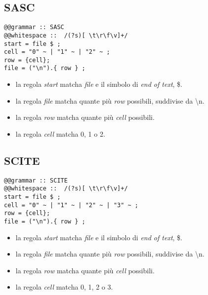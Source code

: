 \subsection{SASC}
{\selectfont
\begin{verbatim}
@@grammar :: SASC
@@whitespace ::  /(?s)[ \t\r\f\v]+/
start = file $ ;
cell = "0" ~ | "1" ~ | "2" ~ ;
row = {cell};
file = ("\n").{ row } ;
\end{verbatim}
}
\begin{itemize}
\item la regola \textit{start} matcha \textit{file} e il simbolo di \textit{end of text}, \$.
\item la regola \textit{file} matcha quante più \textit{row} possibili, suddivise da \textbackslash n.
\item la regola \textit{row} matcha quante più \textit{cell} possibili.
\item la regola \textit{cell} matcha 0, 1 o 2.
\end{itemize}

\subsection{SCITE}
{\selectfont
\begin{verbatim}
@@grammar :: SCITE
@@whitespace ::  /(?s)[ \t\r\f\v]+/
start = file $ ;
cell = "0" ~ | "1" ~ | "2" ~ | "3" ~ ;
row = {cell};
file = ("\n").{ row } ;
\end{verbatim}
}
\begin{itemize}
\item la regola \textit{start} matcha \textit{file} e il simbolo di \textit{end of text}, \$.
\item la regola \textit{file} matcha quante più \textit{row} possibili, suddivise da \textbackslash n.
\item la regola \textit{row} matcha quante più \textit{cell} possibili.
\item la regola \textit{cell} matcha 0, 1, 2 o 3.
\end{itemize}

